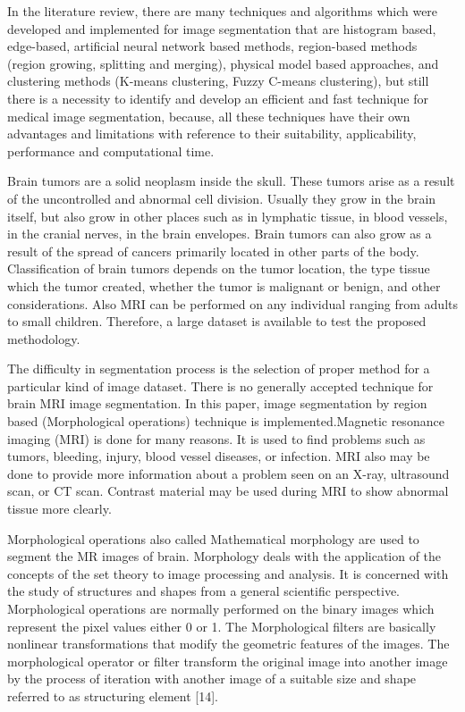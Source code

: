 In the literature review, there are many techniques and algorithms which were developed and implemented for image segmentation that are histogram based, edge-based, artificial neural network based methods, region-based methods (region growing, splitting and merging), physical model based approaches, and clustering methods (K-means clustering, Fuzzy C-means clustering), but still there is a necessity  to identify and develop an efficient and  fast technique for  medical image segmentation, because, all these techniques have their own advantages and limitations with reference to their  suitability, applicability, performance and computational time. 

Brain tumors are a solid neoplasm inside the skull. These tumors arise as a result of the uncontrolled and abnormal cell division. Usually they grow in the brain itself, but also grow in other places such as in lymphatic tissue, in blood vessels, in the cranial nerves, in the brain envelopes. Brain tumors can also grow as a result of the spread of cancers primarily located in other parts of the body. Classification of brain tumors depends on the tumor location, the type tissue which the tumor created, whether the tumor is malignant or benign, and other considerations. Also MRI can be performed on any individual ranging from adults to small children. Therefore, a large dataset is available to test the proposed methodology.

The difficulty in segmentation process is the selection of proper method for a particular kind of image dataset. There is no generally accepted technique for brain MRI image segmentation. In this paper, image segmentation by region based (Morphological operations) technique is implemented.Magnetic resonance imaging (MRI) is done for many reasons. It is used to find problems such as tumors, bleeding, injury, blood vessel diseases, or infection. MRI  also may be done to provide more information about a problem seen on an X-ray, ultrasound scan, or CT scan. Contrast material may be used during MRI to show abnormal tissue more clearly. 

Morphological operations also called Mathematical morphology are used to segment the MR images of brain. Morphology deals with the application of the concepts of the set theory to image processing and analysis. It is concerned with the study of structures and shapes from a general scientific perspective. Morphological operations are normally performed on the binary images which represent the pixel values either 0 or 1. The Morphological filters are basically nonlinear transformations that modify the geometric features of the images. The morphological operator or filter transform the original image into another image by the process of iteration with another image of a suitable size and shape referred to as structuring element [14].

